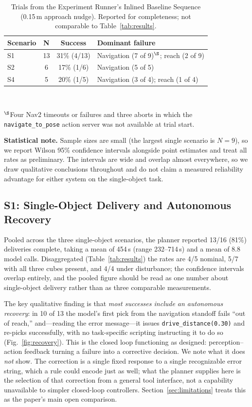 \documentclass[conference]{IEEEtran}
\begin{document}
\begin{table}[t]
\caption{Trials from the Experiment Runner's Inlined Baseline Sequence
(0.15\,m approach nudge). Reported for completeness; not comparable to
Table~\ref{tab:results}.}
\label{tab:runner-baseline}
\centering
\small
\begin{tabular}{@{}lccl@{}}
\toprule
\textbf{Scenario} & \textbf{N} & \textbf{Success} & \textbf{Dominant failure} \\ \midrule
S1 & 13 & 31\% (4/13) & Navigation (7 of 9)$^{\S}$; reach (2 of 9) \\
S2 & 6  & 17\% (1/6)  & Navigation (5 of 5) \\
S4 & 5  & 20\% (1/5)  & Navigation (3 of 4); reach (1 of 4) \\ \bottomrule
\end{tabular}
\\[2pt]
\raggedright\footnotesize $^{\S}$Four Nav2 timeouts or failures and three
aborts in which the \texttt{navigate\_to\_pose} action server was not
available at trial start.
\end{table}

\textbf{Statistical note.} Sample sizes are small (the largest single
scenario is $N=9$), so we report Wilson 95\% confidence intervals alongside
point estimates and treat all rates as preliminary. The intervals are wide
and overlap almost everywhere, so we draw qualitative conclusions
throughout and do not claim a measured reliability advantage for either
system on the single-object task.

\subsection{S1: Single-Object Delivery and Autonomous Recovery}

Pooled across the three single-object scenarios, the planner reported 13/16
(81\%) deliveries complete, taking a mean of 454\,s (range 232--714\,s) and
a mean of 8.8 model calls. Disaggregated (Table~\ref{tab:results}) the rates
are 4/5 nominal, 5/7 with all three cubes present, and 4/4 under
disturbance; the confidence intervals overlap entirely, and the pooled
figure should be read as one number about single-object delivery rather
than as three comparable measurements.

The key qualitative finding is that \emph{most successes include an
autonomous recovery}: in 10 of 13 the model's first pick from the
navigation standoff fails ``out of reach,'' and---reading the error
message---it issues \texttt{drive\_distance(0.30)} and re-picks
successfully, with no task-specific scripting instructing it to do so
(Fig.~\ref{fig:recovery}). This is the closed loop functioning as designed:
perception--action feedback turning a failure into a corrective decision.
We note what it does \emph{not} show. The correction is a single fixed
response to a single recognizable error string, which a rule could encode
just as well; what the planner supplies here is the selection of that
correction from a general tool interface, not a capability unavailable to
simpler closed-loop controllers. Section~\ref{sec:limitations} treats this
as the paper's main open comparison.
\end{document}
